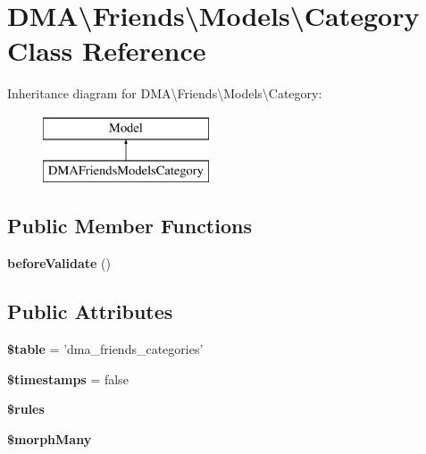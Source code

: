 \hypertarget{classDMA_1_1Friends_1_1Models_1_1Category}{\section{D\-M\-A\textbackslash{}Friends\textbackslash{}Models\textbackslash{}Category Class Reference}
\label{classDMA_1_1Friends_1_1Models_1_1Category}
}
Inheritance diagram for D\-M\-A\textbackslash{}Friends\textbackslash{}Models\textbackslash{}Category\-:\begin{figure}[H]
\begin{center}
\leavevmode
\includegraphics[height=2.000000cm]{de/d78/classDMA_1_1Friends_1_1Models_1_1Category}
\end{center}
\end{figure}
\subsection*{Public Member Functions}
\begin{DoxyCompactItemize}
\item 
\hypertarget{classDMA_1_1Friends_1_1Models_1_1Category_ae8a4b6c28c6f42675844e8e2b30a1f89}{{\bfseries before\-Validate} ()}\label{classDMA_1_1Friends_1_1Models_1_1Category_ae8a4b6c28c6f42675844e8e2b30a1f89}

\end{DoxyCompactItemize}
\subsection*{Public Attributes}
\begin{DoxyCompactItemize}
\item 
\hypertarget{classDMA_1_1Friends_1_1Models_1_1Category_a07d3500cfe462a4db9703ae093158cad}{{\bfseries \$table} = 'dma\-\_\-friends\-\_\-categories'}\label{classDMA_1_1Friends_1_1Models_1_1Category_a07d3500cfe462a4db9703ae093158cad}

\item 
\hypertarget{classDMA_1_1Friends_1_1Models_1_1Category_a2f7a923f3b13a157cc81e2333977584f}{{\bfseries \$timestamps} = false}\label{classDMA_1_1Friends_1_1Models_1_1Category_a2f7a923f3b13a157cc81e2333977584f}

\item 
{\bfseries \$rules}
\item 
{\bfseries \$morph\-Many}
\end{DoxyCompactItemize}
